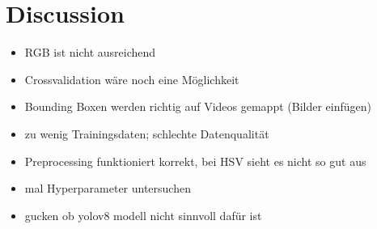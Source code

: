 \chapter{Discussion}
\label{ch:discussion}


\begin{itemize}
    \item RGB ist nicht ausreichend
    \item Crossvalidation wäre noch eine Möglichkeit
    \item Bounding Boxen werden richtig auf Videos gemappt (Bilder einfügen)
    \item zu wenig Trainingsdaten; schlechte Datenqualität
    \item Preprocessing funktioniert korrekt, bei HSV sieht es nicht so gut aus
    \item mal Hyperparameter untersuchen
    \item gucken ob yolov8 modell nicht sinnvoll dafür ist
\end{itemize}

